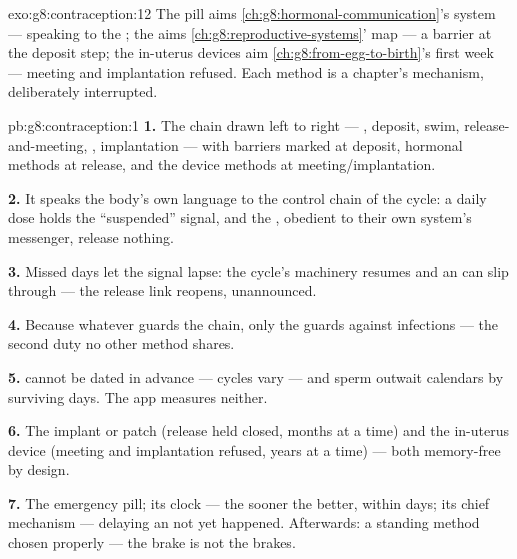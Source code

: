 \begin{solution}{exo:g8:contraception:12}
The pill aims \cref{ch:g8:hormonal-communication}'s
system --- speaking  to the ;
the  aims
\cref{ch:g8:reproductive-systems}' map --- a barrier at
the deposit step; the in-uterus devices aim
\cref{ch:g8:from-egg-to-birth}'s first week --- meeting
and implantation refused. Each method is a chapter's
mechanism, deliberately interrupted.
\end{solution}

\begin{solution}{pb:g8:contraception:1}
\textbf{1.} The chain drawn left to right --- ,
deposit, swim, release-and-meeting, ,
implantation --- with barriers marked at deposit,
hormonal methods at release, and the device methods at
meeting/implantation.

\textbf{2.} It speaks the body's own  language to
the control chain of the cycle: a daily dose holds the
``suspended'' signal, and the , obedient to their
own system's messenger, release nothing.

\textbf{3.} Missed days let the signal lapse: the cycle's
machinery resumes and an  can slip through ---
the release link reopens, unannounced.

\textbf{4.} Because whatever guards the chain, only the
 guards against infections --- the second duty no
other method shares.

\textbf{5.}  cannot be dated in advance ---
cycles vary --- and sperm outwait calendars by surviving
days. The app measures neither.

\textbf{6.} The implant or patch (release held closed,
months at a time) and the in-uterus device (meeting and
implantation refused, years at a time) --- both
memory-free by design.

\textbf{7.} The emergency pill; its clock --- the sooner
the better, within days; its chief mechanism --- delaying
an  not yet happened. Afterwards: a standing
method chosen properly --- the brake is not the brakes.


\end{solution}

